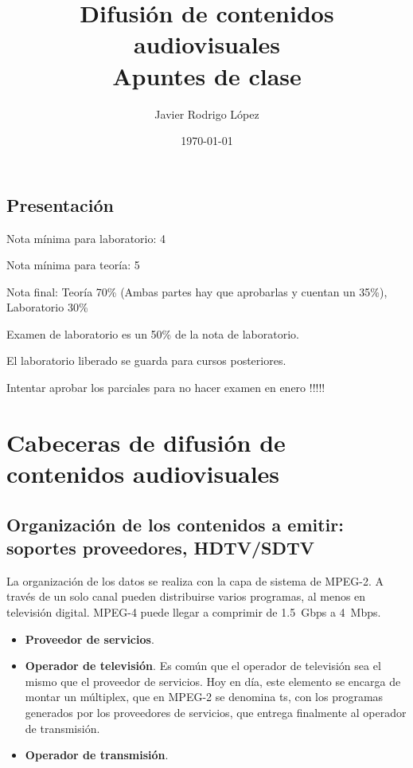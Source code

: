 \documentclass[10pt]{book}
\title{\Huge Difusión de contenidos audiovisuales\\\huge Apuntes de clase}
\author{Javier Rodrigo López}
\date{\today}
\begin{document}
\maketitle

\tableofcontents

\printacronyms
\acresetall


\newpage

\section*{Presentación}

Nota mínima para laboratorio: 4

Nota mínima para teoría: 5

Nota final: Teoría 70\% (Ambas partes hay que aprobarlas y cuentan un 35\%), Laboratorio 30\%

Examen de laboratorio es un 50\% de la nota de laboratorio.

El laboratorio liberado se guarda para cursos posteriores.

Intentar aprobar los parciales para no hacer examen en enero !!!!!

\newpage



\chapter{Cabeceras de difusión de contenidos audiovisuales}
\section{Organización de los contenidos a emitir: soportes proveedores, \mbox{HDTV/SDTV}}
La organización de los datos se realiza con la capa de sistema de MPEG-2. A través de un solo canal pueden distribuirse varios programas, al menos en televisión digital. MPEG-4 puede llegar a comprimir de \SI{1.5}{Gbps} a \SI{4}{Mbps}.

\begin{itemize}
  \item \textbf{Proveedor de servicios}.
  \item \textbf{Operador de televisión}. Es común que el operador de televisión sea el mismo que el proveedor de servicios. Hoy en día, este elemento se encarga de montar un múltiplex, que en MPEG-2 se denomina \ac{ts}, con los programas generados por los proveedores de servicios, que entrega finalmente al operador de transmisión.
  \item \textbf{Operador de transmisión}.
\end{itemize}
\end{document}
